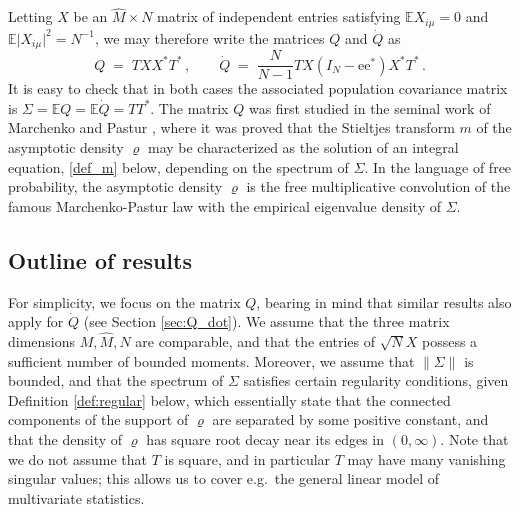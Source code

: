 \documentclass[11pt]{article} %
\numberwithin{equation}{section}
\numberwithin{figure}{section}
\theoremstyle{plain} %
\theoremstyle{definition} %
\newcommand{\f}[1]{\boldsymbol{\mathrm{#1}}} %
\newcommand{\wh}{\widehat}
\newcommand{\E}{\mathbb{E}}
\newcommand{\abs}[1]{\lvert #1 \rvert}
\newcommand{\norm}[1]{\lVert #1 \rVert}
\begin{document}
Letting $X$ be an $\wh M \times N$ matrix of independent entries satisfying $\E X_{i \mu} = 0$ and $\E \abs{X_{i \mu}}^2 = N^{-1}$, we may therefore write the matrices $Q$ and $\dot Q$ as
\begin{equation} \label{def_Q}
Q \;=\; T X X^* T^*\,, \qquad \dot Q \;=\; \frac{N}{N-1} T X (I_N - \f e \f e^*) X^* T^*\,.
\end{equation}
It is easy to check that in both cases the associated population covariance matrix is $\Sigma = \E Q = \E \dot Q = T T^*$. The matrix $Q$ was first studied in the seminal work of Marchenko and Pastur \cite{MP}, where it was proved that the Stieltjes transform $m$ of the asymptotic density $\varrho$ may be characterized as the solution of an integral equation, \eqref{def_m} below, depending on the spectrum of $\Sigma$. In the language of free probability, the asymptotic density $\varrho$ is the free multiplicative convolution of the famous Marchenko-Pastur law with the empirical eigenvalue density of $\Sigma$.


\subsection{Outline of results}
For simplicity, we focus on the matrix $Q$, bearing in mind that similar results also apply for $\dot Q$ (see Section \ref{sec:Q_dot}). We assume that the three matrix dimensions $M, \wh M, N$ are comparable, and that the entries of $\sqrt{N} X$ possess a sufficient number of bounded moments. Moreover, we assume that $\norm{\Sigma}$ is bounded, and that the spectrum of $\Sigma$ satisfies certain regularity conditions, given Definition \ref{def:regular} below, which essentially state that the connected components of the support of $\varrho$ are separated by some positive constant, and that the density of $\varrho$ has square root decay near its edges in $(0,\infty)$. Note that we do not assume that $T$ is square, and in particular $T$ may have many vanishing singular values; this allows us to cover e.g.\ the general linear model of multivariate statistics.
\end{document}
